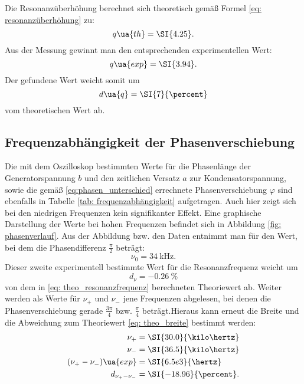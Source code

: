 Die Resonanzüberhöhung berechnet sich theoretisch gemäß Formel \eqref{eq: resonanzüberhöhung} zu:
\begin{equation}
  q\ua{th} = \SI{4.25}.
\end{equation}
Aus der Messung gewinnt man den entsprechenden experimentellen Wert:
\begin{equation}
    q\ua{exp} = \SI{3.94}.
\end{equation}
Der gefundene Wert weicht somit um
\begin{equation}
  d\ua{q} = \SI{7}{\percent}
\end{equation}
vom theoretischen Wert ab.

\subsection{Frequenzabhängigkeit der Phasenverschiebung}
Die mit dem Oszilloskop bestimmten Werte für die Phasenlänge der Generatorspannung $b$ und den zeitlichen Versatz $a$ zur Kondensatorspannung, sowie die gemäß \eqref{eq:phasen_unterschied}
errechnete Phasenverschiebung $\varphi$ sind ebenfalls in Tabelle \ref{tab: frequenzabhängigkeit} aufgetragen. Auch hier zeigt sich bei den niedrigen
Frequenzen kein signifikanter Effekt. Eine graphische Darstellung der Werte bei hohen Frequenzen befindet sich in
Abbildung \ref{fig: phasenverlauf}. Aus der Abbildung bzw. den Daten entnimmt man für den Wert, bei dem die Phasendifferenz $\frac{\pi}{2}$ beträgt:
\begin{equation}
  \nu_0 = \SI{34}{\kilo\hertz}.
\end{equation}
Dieser zweite experimentell bestimmte Wert für die Resonanzfrequenz weicht um
\begin{equation}
  d_{\nu} = \SI{-0.26}{\percent}
\end{equation}
von dem in \eqref{eq: theo_resonanzfrequenz} berechneten Theoriewert ab.
Weiter werden als Werte für $\nu_+$ und $\nu_-$ jene Frequenzen abgelesen, bei denen die Phasenverschiebung
gerade $\frac{3\pi}{4}$ bzw. $\frac{\pi}{4}$ beträgt.\newpage Hieraus kann erneut die Breite und die Abweichung
zum Theoriewert \eqref{eq: theo_breite} bestimmt werden:
\begin{align}
  \begin{aligned}
  \nu_{+} &= \SI{30.0}{\kilo\hertz} \\
  \nu_{-} &= \SI{36.5}{\kilo\hertz} \\
  (\nu_{+}-\nu_{-})\ua{exp} &= \SI{6.5e3}{\hertz} \\
  d_{\nu_{+}-\nu_{-}} &= \SI{-18.96}{\percent}.
\end{aligned}
\end{align}


